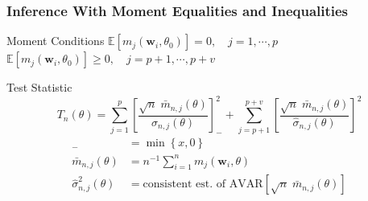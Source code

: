 \documentclass{beamer}
\begin{document}
\begin{frame}
  \frametitle{Inference With Moment Equalities and Inequalities}
  \small

\begin{block}{Moment Conditions}
  $\mathbb{E} \left[ m_j(\mathbf{w}_i,\theta_0) \right] = 0, \quad j = 1, \cdots, p$\\
  $\mathbb{E} \left[ m_j(\mathbf{w}_i,\theta_0) \right]  \geq 0, \quad j = p+1, \cdots, p + v$
\end{block}




\begin{block}{Test Statistic}
  \vspace{-1em}
\[
  T_n(\theta) = \sum_{j=1}^p \left[\frac{\sqrt{n}\; \bar{m}_{n,j}(\theta)}{\widehat{\sigma}_{n,j}(\theta)}\right]^2_- + \sum_{j=p+1}^{p+v} \left[\frac{\sqrt{n}\; \bar{m}_{n,j}(\theta)}{\widehat{\sigma}_{n,j}(\theta)}\right]^2
\]
\footnotesize
\begin{align*}
[x]_- &= \min\left\{ x, 0 \right\}\\
\bar{m}_{n,j}(\theta) &= n^{-1} \sum_{i=1}^{n} m_j(\mathbf{w}_i, \theta)\\
\widehat{\sigma}^2_{n,j}(\theta) &=  \mbox{consistent est.\ of } \mbox{AVAR}\left[  \sqrt{n}\; \bar{m}_{n,j}(\theta)\right]
\end{align*}
\end{block}

\end{frame}
\end{document}
